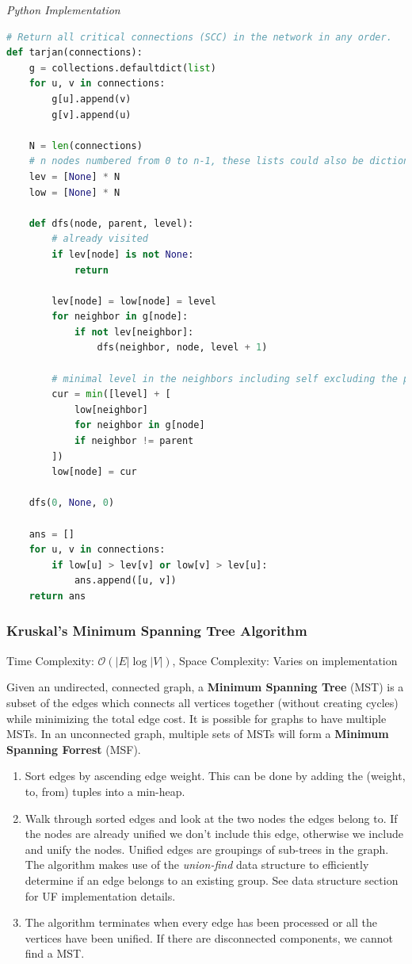 \documentclass{article}
\newcommand{\bigO}{\mathcal{O}}
\begin{document}
\vspace{8pt} \emph{Python Implementation}
\begin{lstlisting}[language=Python]
# Return all critical connections (SCC) in the network in any order.
def tarjan(connections):
    g = collections.defaultdict(list)
    for u, v in connections:
        g[u].append(v)
        g[v].append(u)

    N = len(connections)
    # n nodes numbered from 0 to n-1, these lists could also be dictionaries
    lev = [None] * N
    low = [None] * N

    def dfs(node, parent, level):
        # already visited
        if lev[node] is not None:
            return

        lev[node] = low[node] = level
        for neighbor in g[node]:
            if not lev[neighbor]:
                dfs(neighbor, node, level + 1)

        # minimal level in the neighbors including self excluding the parent
        cur = min([level] + [
            low[neighbor]
            for neighbor in g[node]
            if neighbor != parent
        ])
        low[node] = cur

    dfs(0, None, 0)

    ans = []
    for u, v in connections:
        if low[u] > lev[v] or low[v] > lev[u]:
            ans.append([u, v])
    return ans
\end{lstlisting}
    
    
    \subsubsection{Kruskal's Minimum Spanning Tree Algorithm}
    Time Complexity: $\bigO(|E|\log|V|)$, Space Complexity: Varies on implementation
    
    Given an undirected, connected graph, a \textbf{Minimum Spanning Tree} (MST) is a subset of the edges which connects all vertices together (without creating cycles) while minimizing the total edge cost. It is possible for graphs to have multiple MSTs. In an unconnected graph, multiple sets of MSTs will form a \textbf{Minimum Spanning Forrest} (MSF).
    
    \begin{enumerate}
        \item Sort edges by ascending edge weight. This can be done by adding the (weight, to, from) tuples into a min-heap.
        \item Walk through sorted edges and look at the two nodes the edges belong to. If the nodes are already unified we don't include this edge, otherwise we include and unify the nodes. Unified edges are groupings of sub-trees in the graph. The algorithm makes use of the \textit{union-find} data structure to efficiently determine if an edge belongs to an existing group. See data structure section for UF implementation details.
        \item The algorithm terminates when every edge has been processed or all the vertices have been unified. If there are disconnected components, we cannot find a MST.
    \end{enumerate}
    
\end{document}
